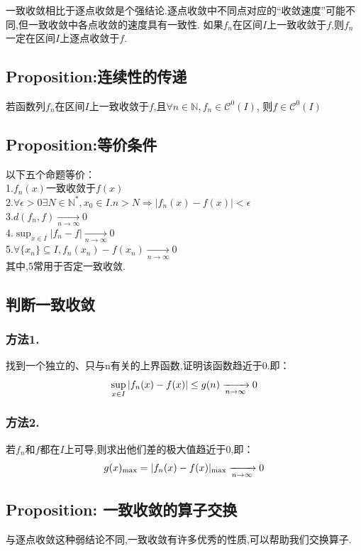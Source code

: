 \documentclass[12pt, a4paper, oneside]{ctexbook}
\newcommand{\C }{\mathcal{C}}%
\begin{document}
  一致收敛相比于逐点收敛是个强结论.逐点收敛中不同点对应的“收敛速度”可能不同,但一致收敛中各点收敛的速度具有一致性.
  如果$f_n$在区间$I$上一致收敛于$f$,则$f_n$一定在区间$I$上逐点收敛于$f$.
  \subsection{Proposition:连续性的传递}
  若函数列$f_n$在区间$I$上一致收敛于$f$,且$\forall n\in\mathbb{N}, f_n\in\C ^0(I)$,
  则$f\in\C ^0(I)$
  \subsection{Proposition:等价条件}
  \noindent
  以下五个命题等价：\\
  1.$f_n(x)$一致收敛于$f(x)$\\
  2.$\forall \epsilon>0 \exists N\in \mathbb{N}^*, x_0\in I. n>N\Rightarrow | f_n(x)-f(x) |<\epsilon$ \\
  3.$d(f_n,f)\xrightarrow[n\rightarrow\infty]{}0$\\
  4.$\sup_{x\in I}| f_n-f|\xrightarrow[n\rightarrow\infty]{}0$\\
  5.$\forall \{x_n\}\subseteq I,f_n(x_n)-f(x_n)\xrightarrow[n\rightarrow\infty]{}0 $\\
  其中,5常用于否定一致收敛.
  \subsection{判断一致收敛}
  \subsubsection{方法1.}
  找到一个独立的、只与n有关的上界函数,证明该函数趋近于0.即：
  \begin{equation}
    \notag
    \sup_{x\in I}| f_n(x)-f(x)|\leq g(n)\xrightarrow[n\rightarrow\infty]{}0   
  \end{equation}
  \subsubsection{方法2.}
  若$f_n$和$f$都在$I$上可导,则求出他们差的极大值趋近于0,即：
  \begin{equation}
    \notag
    g(x)_{\max}=|f_n(x)-f(x)|_{\max}\xrightarrow[n\rightarrow\infty]{}0   
  \end{equation}
  \subsection{Proposition: 一致收敛的算子交换}
  与逐点收敛这种弱结论不同,一致收敛有许多优秀的性质,可以帮助我们交换算子.
\end{document}
